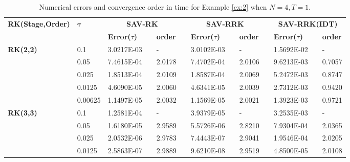 \begin{table}[H]\footnotesize
	\centering
	\caption{Numerical errors and convergence order in time for Example \ref{ex:2} when $N=4, T = 1$.}
	\begin{tabular}{lllllrlrlrlrlrl}
	\toprule
	\multicolumn{2}{l}{\multirow{2}[3]{*}{\textbf{RK(Stage,Order)}}} & \multicolumn{2}{l}{\multirow{2}[3]{*}{$\bm{\tau}$}} & \multicolumn{3}{c}{\textbf{SAV-RK}} &       & \multicolumn{3}{c}{\textbf{SAV-RRK}} &       & \multicolumn{3}{c}{\textbf{SAV-RRK(IDT)}} \\
	\cmidrule{5-7}\cmidrule{9-11}\cmidrule{13-15}    \multicolumn{2}{l}{} & \multicolumn{2}{l}{} & \textbf{Error($\tau$)} &       & \textbf{order} &       & \textbf{Error($\tau$)} &       & \textbf{order} &       & \textbf{Error($\tau$)} &       & \textbf{order} \\
	\hline
	\multicolumn{2}{l}{\multirow{5}[0]{*}{\textbf{RK(2,2)}}} & \multicolumn{2}{l}{0.1} & 3.0217E-03 &       & -     &       & 3.0102E-03 &       & -     &       & 1.5692E-02 &       & - \\
	\multicolumn{2}{l}{} & \multicolumn{2}{l}{0.05} & 7.4615E-04 &       & 2.0178  &       & 7.4702E-04 &       & 2.0106  &       & 9.6213E-03 &       & 0.7057  \\
	\multicolumn{2}{l}{} & \multicolumn{2}{l}{0.025} & 1.8513E-04 &       & 2.0109  &       & 1.8587E-04 &       & 2.0069  &       & 5.2472E-03 &       & 0.8747  \\
	\multicolumn{2}{l}{} & \multicolumn{2}{l}{0.0125} & 4.6090E-05 &       & 2.0060  &       & 4.6341E-05 &       & 2.0039  &       & 2.7312E-03 &       & 0.9420  \\
	\multicolumn{2}{l}{} & \multicolumn{2}{l}{0.00625} & 1.1497E-05 &       & 2.0032  &       & 1.1569E-05 &       & 2.0021  &       & 1.3923E-03 &       & 0.9721  \\
	\multicolumn{2}{l}{\multirow{5}[0]{*}{\textbf{RK(3,3)}}} & \multicolumn{2}{l}{0.1} & 1.2581E-04 &       & -     &       & 3.9379E-05 &       & -     &       & 3.2535E-03 &       & - \\
	\multicolumn{2}{l}{} & \multicolumn{2}{l}{0.05} & 1.6180E-05 &       & 2.9589  &       & 5.5726E-06 &       & 2.8210  &       & 7.9304E-04 &       & 2.0365  \\
	\multicolumn{2}{l}{} & \multicolumn{2}{l}{0.025} & 2.0532E-06 &       & 2.9783  &       & 7.4443E-07 &       & 2.9041  &       & 1.9546E-04 &       & 2.0205  \\
	\multicolumn{2}{l}{} & \multicolumn{2}{l}{0.0125} & 2.5863E-07 &       & 2.9889  &       & 9.6210E-08 &       & 2.9519  &       & 4.8500E-05 &       & 2.0108  \\

\end{tabular}
\end{table}
